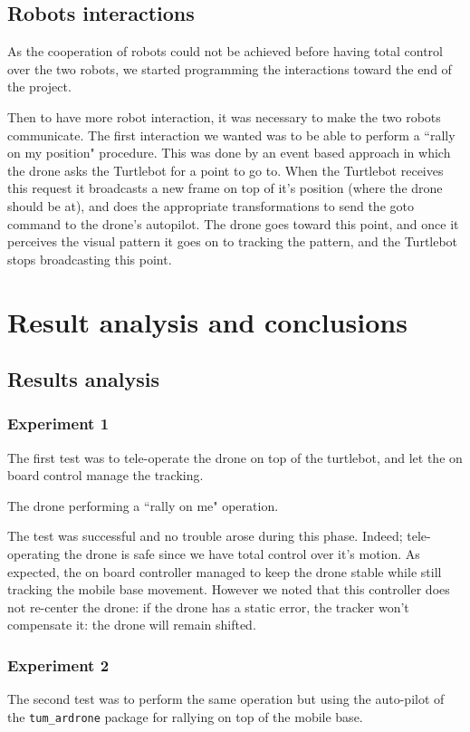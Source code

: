 \documentclass[11pt,a4paper]{article}
\begin{document}
\subsection{Robots interactions}


As the cooperation of robots could not be achieved before having total control over the two robots, 
we started programming the interactions toward the end of the project.

Then to have more robot interaction, it was necessary to make the two robots communicate.
The first interaction we wanted was to be able to perform a ``rally on my position" procedure.
This was done by an event based approach in which the drone asks the Turtlebot for a point to go to. When the Turtlebot receives this request it broadcasts a new frame on top of it's position (where the drone should be at), and does the appropriate transformations to send the goto command to the drone's autopilot. The drone goes toward this point, and once it perceives the visual pattern it goes on to tracking the pattern, and the Turtlebot stops broadcasting this point.



\section{Result analysis and conclusions}
\subsection{Results analysis}
\subsubsection{Experiment 1}
The first test was to tele-operate the drone on top of the turtlebot, and let the on board control
manage the tracking.

The drone performing a ``rally on me" operation.

The test was successful and no trouble arose during this phase. Indeed; tele-operating the drone is 
safe since we have total control over it's motion.
As expected, the on board controller managed to keep the drone stable while still tracking the mobile base 
movement. However we noted that this controller does not re-center the drone: if the drone has a static
error, the tracker won't compensate it: the drone will remain shifted.

\subsubsection{Experiment 2}
The second test was to perform the same operation but using the auto-pilot of the \verb!tum_ardrone!
package for rallying on top of the mobile base.
\end{document}
